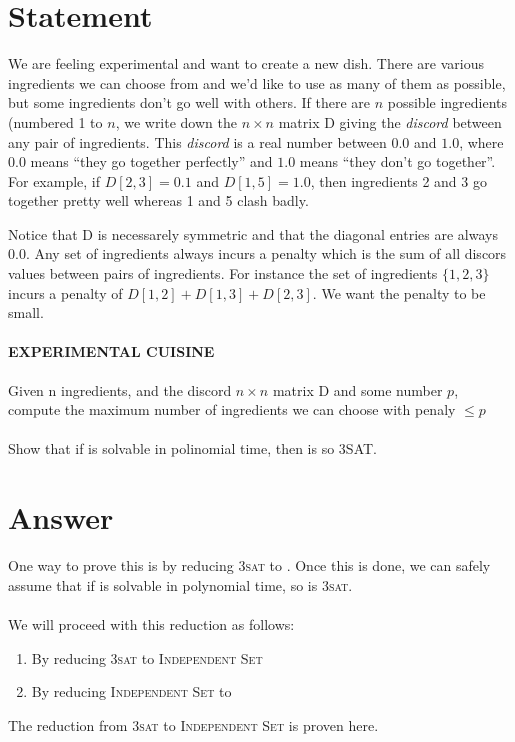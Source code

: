 \section*{Statement}

We are feeling experimental and want to create a new dish. There are various ingredients we can choose from and we'd like to use as many of them as possible, but some ingredients don't go well with others. If there are $n$ possible ingredients (numbered 1 to $n$, we write down the $n\times n$ matrix D giving the \textit{discord} between any pair of ingredients. This \textit{discord} is a real number between $0.0$ and $1.0$, where $0.0$ means ``they go together perfectly'' and $1.0$ means ``they don't go together''. For example, if $D[2,3] = 0.1$ and $D[1,5] = 1.0$, then ingredients 2 and 3 go together pretty well whereas 1  and 5 clash badly.

Notice that D is necessarely symmetric and that the diagonal entries are always $0.0$. Any set of ingredients always incurs a penalty which is the sum of all discors values between pairs of ingredients. For instance the set of ingredients $\{1,2,3\}$ incurs a penalty of $D[1,2] + D[1,3] + D[2,3]$. We want the penalty to be small.

\paragraph{EXPERIMENTAL CUISINE}
Given n ingredients, and the discord $n \times n$ matrix D and some number $p$, compute the maximum number of ingredients we can choose with penaly $\leq p$
\\ \\
Show that if \ExC is solvable in polinomial time, then is so 3SAT.

\section*{Answer}
One way to prove this is by reducing \textsc{3sat} to \ExC. Once this is done, we can safely assume that if \ExC is solvable in polynomial time, so is \textsc{3sat}.
\\ \\
We will proceed with this reduction as follows:
\begin{enumerate}
  \item By reducing \textsc{3sat} to \textsc{Independent Set}
  \item By reducing \textsc{Independent Set} to \ExC
\end{enumerate}
The reduction from \textsc{3sat} to \textsc{Independent Set} is proven here\cite{indep_set_proof}.

